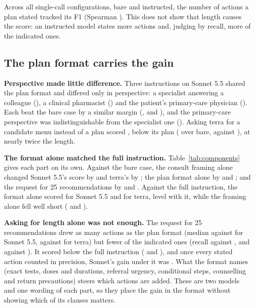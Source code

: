 \documentclass[11pt]{article}
\begin{document}
Across all \covLengthArms{} single-call configurations, bare and instructed, the number of actions a
plan stated tracked its F1 (Spearman \covLengthRho{} \covLengthRhoCI{}). This does not show that
length causes the score: an instructed model states more actions and, judging by recall, more of the
indicated ones.

\subsection{The plan format carries the gain}
\label{sec:components}
\textbf{Perspective made little difference.} Three instructions on Sonnet 5.5 shared the plan format
and differed only in perspective: a specialist answering a colleague (\covFSonnetSpec{}), a clinical
pharmacist (\covFSonnetPharm{}) and the patient's primary-care physician (\covFSonnetPcp{}). Each
beat the bare case by a similar margin (\covDPromptSonnet{}, \covDPromptSonnetPharm{} and
\covDPromptSonnetPcp{}), and the primary-care perspective was indistinguishable from the specialist
one (\covDPcpVsSpec{}). Asking terra for a candidate menu instead of a plan scored \covFTerraMenu{},
below its plan (\covDPromptTerraMenu{} over bare, against \covDPromptTerra{}), at nearly twice the
length.

\textbf{The format alone matched the full instruction.} Table~\ref{tab:components} gives each part on
its own. Against the bare case, the consult framing alone changed Sonnet 5.5's score by
\covDSonnetFramingVsBare{} and terra's by \covDTerraFramingVsBare{}; the plan format alone by
\covDSonnetFormatVsBare{} and \covDTerraFormatVsBare{}; and the request for 25 recommendations by
\covDSonnetLengthVsBare{} and \covDTerraLengthVsBare{}. Against the full instruction, the format alone
scored \covDSonnetFormatVsSpec{} for Sonnet 5.5 and \covDTerraFormatVsSpec{} for terra, level with
it, while the framing alone fell well short (\covDSonnetFramingVsSpec{} and
\covDTerraFramingVsSpec{}).

\textbf{Asking for length alone was not enough.} The request for 25 recommendations drew as many
actions as the plan format (median \covASonnetLength{} against \covASonnetFormat{} for Sonnet 5.5,
\covATerraLength{} against \covATerraFormat{} for terra) but fewer of the indicated ones (recall
\covRSonnetLength{} against \covRSonnetFormat{}, and \covRTerraLength{} against \covRTerraFormat{}).
It scored below the full instruction (\covDSonnetLengthVsSpec{} and \covDTerraLengthVsSpec{}), and
once every stated action counted in precision, Sonnet's gain under it was
\covDAllSonnetLengthVsBare{}. What the format names (exact tests, doses and durations, referral
urgency, conditional steps, counselling and return precautions) steers which actions are added. These
are two models and one wording of each part, so they place the gain in the format without showing
which of its clauses matters.
\end{document}
